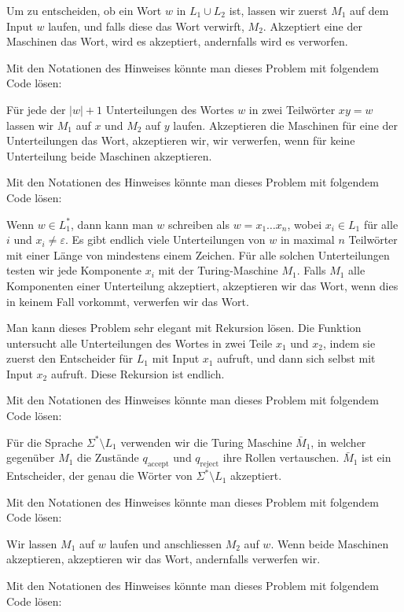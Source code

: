 \begin{loesung}
\begin{teilaufgaben}
\item Um zu entscheiden, ob ein Wort $w$ in $L_1\cup L_2$ ist,
lassen wir zuerst $M_1$ auf dem Input $w$ laufen, und falls
diese das Wort verwirft, $M_2$.
Akzeptiert eine der Maschinen
das Wort, wird es akzeptiert, andernfalls wird es verworfen.

Mit den Notationen des Hinweises könnte man dieses Problem mit folgendem
Code lösen:
\item
Für jede der $|w|+1$ Unterteilungen des Wortes $w$ in zwei
Teilwörter $xy=w$ lassen wir $M_1$ auf $x$ und $M_2$ auf
$y$ laufen.
Akzeptieren die Maschinen für eine der
Unterteilungen das Wort, akzeptieren wir, wir verwerfen, wenn
für keine Unterteilung beide Maschinen akzeptieren.

Mit den Notationen des Hinweises könnte man dieses Problem mit folgendem
Code lösen:
\item
Wenn $w\in L_1^*$, dann kann man $w$ schreiben als
$w=x_1\dots x_n$, wobei $x_i\in L_1$ für alle $i$ und
$x_i\ne \varepsilon$.
Es gibt endlich viele Unterteilungen von $w$ in maximal $n$ Teilwörter
mit einer Länge von mindestens einem Zeichen.
Für alle solchen Unterteilungen testen wir jede Komponente $x_i$ mit der
Turing-Maschine $M_1$.
Falls $M_1$ alle Komponenten einer Unterteilung
akzeptiert, akzeptieren wir das Wort, wenn dies in keinem Fall
vorkommt, verwerfen wir das Wort.

Man kann dieses Problem sehr elegant mit Rekursion lösen.
Die Funktion untersucht alle Unterteilungen des Wortes in
zwei Teile $x_1$ und $x_2$, indem sie zuerst den Entscheider
für $L_1$ mit Input $x_1$ aufruft, und dann sich selbst
mit Input $x_2$ aufruft. Diese Rekursion ist endlich.

Mit den Notationen des Hinweises könnte man dieses Problem mit folgendem
Code lösen:
\item
Für die Sprache $\Sigma^*\setminus L_1$ verwenden wir die
Turing Maschine $\bar M_1$, in welcher gegenüber $M_1$
die Zustände $q_{\text{accept}}$ und $q_{\text{reject}}$
ihre Rollen vertauschen. $\bar M_1$ ist ein Entscheider,
der genau die Wörter von $\Sigma^*\setminus L_1$ akzeptiert.

Mit den Notationen des Hinweises könnte man dieses Problem mit folgendem
Code lösen:
\item
Wir lassen $M_1$ auf $w$ laufen und anschliessen $M_2$ auf $w$.
Wenn beide Maschinen akzeptieren, akzeptieren wir das Wort, andernfalls
verwerfen wir.

Mit den Notationen des Hinweises könnte man dieses Problem mit folgendem
Code lösen:
\end{teilaufgaben}
\end{loesung}

